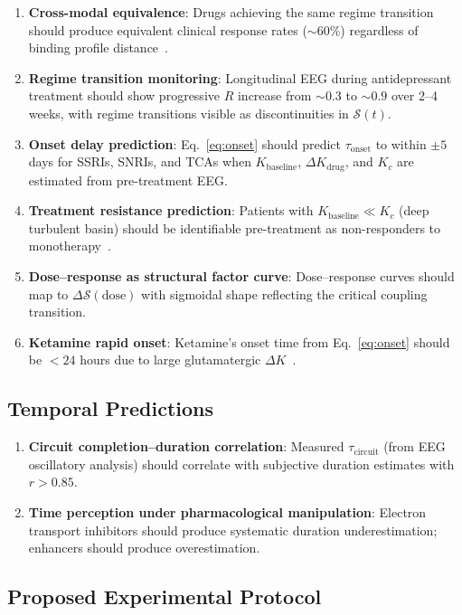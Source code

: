 \documentclass[twocolumn,10pt]{article}
\theoremstyle{remark}
\newcommand{\Rorder}{R}
\begin{document}
\begin{enumerate}[nosep]
  \item \textbf{Cross-modal equivalence}: Drugs achieving the same regime transition should produce equivalent clinical response rates ($\sim\!60\%$) regardless of binding profile distance~\citep{cipriani2018comparative}.
  \item \textbf{Regime transition monitoring}: Longitudinal EEG during antidepressant treatment should show progressive $\Rorder$ increase from $\sim\!0.3$ to $\sim\!0.9$ over 2--4 weeks, with regime transitions visible as discontinuities in $\mathcal{S}(t)$.
  \item \textbf{Onset delay prediction}: Eq.~\eqref{eq:onset} should predict $\tau_{\mathrm{onset}}$ to within $\pm 5$ days for SSRIs, SNRIs, and TCAs when $K_{\mathrm{baseline}}$, $\Delta K_{\mathrm{drug}}$, and $K_c$ are estimated from pre-treatment EEG.
  \item \textbf{Treatment resistance prediction}: Patients with $K_{\mathrm{baseline}} \ll K_c$ (deep turbulent basin) should be identifiable pre-treatment as non-responders to monotherapy~\citep{rush2006acute}.
  \item \textbf{Dose--response as structural factor curve}: Dose--response curves should map to $\Delta\mathcal{S}(\text{dose})$ with sigmoidal shape reflecting the critical coupling transition.
  \item \textbf{Ketamine rapid onset}: Ketamine's onset time from Eq.~\eqref{eq:onset} should be $< 24$ hours due to large glutamatergic $\Delta K$~\citep{zarate2006randomized}.
\end{enumerate}

\subsection{Temporal Predictions}

\begin{enumerate}[nosep]
  \item \textbf{Circuit completion--duration correlation}: Measured $\tau_{\mathrm{circuit}}$ (from EEG oscillatory analysis) should correlate with subjective duration estimates with $r > 0.85$.
  \item \textbf{Time perception under pharmacological manipulation}: Electron transport inhibitors should produce systematic duration underestimation; enhancers should produce overestimation.
\end{enumerate}

\subsection{Proposed Experimental Protocol}
\end{document}
